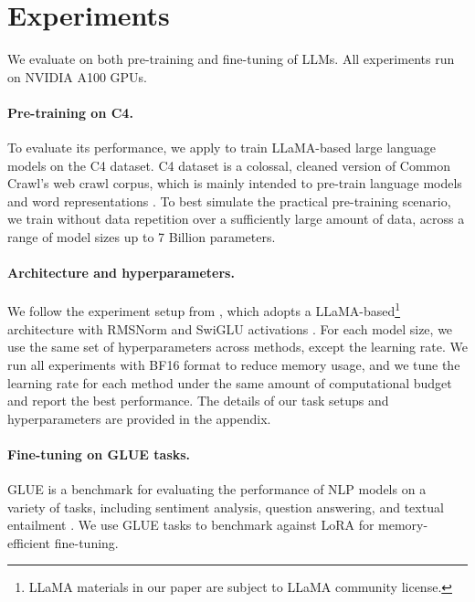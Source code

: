 \section{Experiments}



We evaluate \lowrank{} on both pre-training and fine-tuning of LLMs. All experiments run on NVIDIA A100 GPUs.\vspace{-2mm}

 

\paragraph{Pre-training on C4.}
To evaluate its performance, we apply \lowrank{} to train LLaMA-based large language models on the C4 dataset. 
C4 dataset is a colossal, cleaned version of Common Crawl's web crawl corpus, which is mainly intended to pre-train language models and word representations \citep{raffelExploringLimitsTransfer2023}.
To best simulate the practical pre-training scenario, we train without data repetition over a sufficiently large amount of data, across a range of model sizes up to 7 Billion parameters.
\paragraph{Architecture and hyperparameters.}
We follow the experiment setup from \citet{lialinReLoRAHighRankTraining2023}, which adopts a LLaMA-based\footnote[3]{LLaMA materials in our paper are subject to LLaMA community license.} architecture with RMSNorm and SwiGLU activations \citep{zhangRootMeanSquare2019,shazeerGLUVariantsImprove2020,touvronLlamaOpenFoundation2023}. 
For each model size, we use the same set of hyperparameters across methods, except the learning rate.
We run all experiments with BF16 format to reduce memory usage, and we tune the learning rate for each method under the same amount of computational budget and report the best performance.
The details of our task setups and hyperparameters are provided in the appendix.
\paragraph{Fine-tuning on GLUE tasks.}
GLUE is a benchmark for evaluating the performance of NLP models on a variety of tasks, including sentiment analysis, question answering, and textual entailment \citep{wangGLUEMultiTaskBenchmark2019}.
We use GLUE tasks to benchmark \lowrank{} against LoRA for memory-efficient fine-tuning.

